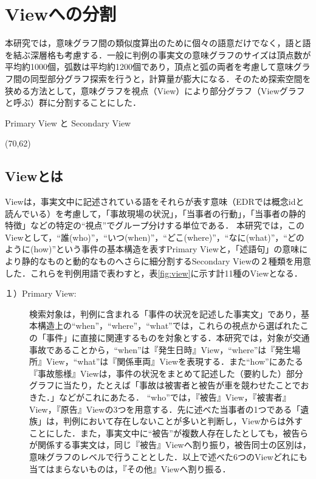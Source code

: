 \section{Viewへの分割}
本研究では，意味グラフ間の類似度算出のために個々の語意だけでなく，語と語を結ぶ深層格も考慮する．一般に判例の事実文の意味グラフのサイズは頂点数が平均約1000個，弧数は平均約1200個であり，頂点と弧の両者を考慮して意味グラフ間の同型部分グラフ探索を行うと，計算量が膨大になる．そのため探索空間を狭める方法として，意味グラフを視点（View）により部分グラフ（Viewグラフと呼ぶ）群に分割することにした．

\begin{table}
\begin{center}
 \caption{Primary View と Secondary View}
 \atari(70,62)
 \label{fig:view}
\end{center}
\end{table}

\subsection{Viewとは}
Viewは，事実文中に記述されている語をそれらが表す意味（EDRでは概念idと読んでいる）を考慮して，「事故現場の状況」，「当事者の行動」，「当事者の静的特徴」などの特定の``視点''でグループ分けする単位である．
本研究では，このViewとして，``誰(who)''，``いつ(when)''，``どこ(where)''，``なに(what)''，``どのように(how)''という事件の基本構造を表すPrimary Viewと，「述語句」の意味により静的なものと動的なものへさらに細分割するSecondary Viewの２種類を用意した．これらを判例用語で表わすと，表\ref{fig:view}に示す計11種のViewとなる．

\begin{description}
\item[１）Primary View:]検索対象は，判例に含まれる「事件の状況を記述した事実文」であり，基本構造上の``when''，``where''，``what''では，これらの視点から選ばれたこの「事件」に直接に関連するものを対象とする．本研究では，対象が交通事故であることから，``when''は『発生日時』View，``where''は『発生場所』View，``what''は『関係車両』Viewを表現する．また``how''にあたる『事故態様』Viewは，事件の状況をまとめて記述した（要約した）部分グラフに当たり，たとえば「事故は被害者と被告が車を競わせたことでおきた．」などがこれにあたる．
``who''では，『被告』View，『被害者』View，『原告』Viewの3つを用意する．先に述べた当事者の1つである「遺族」は，判例において存在しないことが多いと判断し，Viewからは外すことにした．また，事実文中に``被告''が複数人存在したとしても，被告らが関係する事実文は，同じ『被告』Viewへ割り振り，被告同士の区別は，意味グラフのレベルで行うこととした．以上で述べた6つのViewどれにも当てはまらないものは，『その他』Viewへ割り振る．
\end{description}

